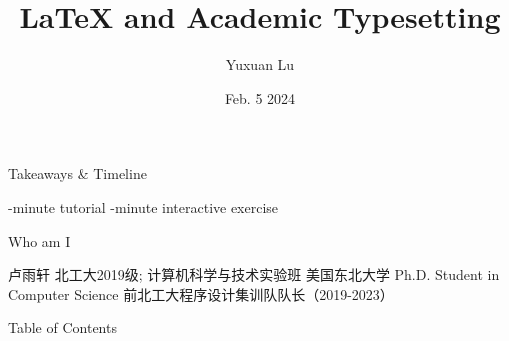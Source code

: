 \documentclass[scheme=plain]{ctexbeamer}
\title{LaTeX and Academic Typesetting}
\author{Yuxuan Lu}
\institute{北京工业大学程序设计集训队}
\institute{Northeastern Human-Centered AI Lab}
\date{Feb. 5 2024}
\begin{document}
\maketitle

\begin{frame}{Takeaways \& Timeline}
    \begin{outline}
        -minute tutorial
        -minute interactive exercise
    \end{outline}
\end{frame}

\ifbjut
\begin{frame}{Who am I}
    \begin{outline}
        \Large
        \1 卢雨轩
        \normalsize
        \1 北工大2019级; 计算机科学与技术实验班
        \1 美国东北大学 Ph.D. Student in Computer Science
        \1 前北工大程序设计集训队队长（2019-2023）
        

    \end{outline}
\end{frame}
\fi

\begin{frame}{Table of Contents}
    \tableofcontents
\end{frame}
\end{document}
